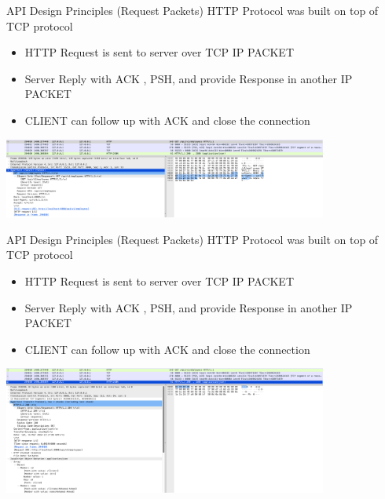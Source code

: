 \documentclass{beamer}
\begin{document}
\begin{frame}{API Design Principles (Request Packets)}
	\scriptsize
	HTTP Protocol was built on top of TCP protocol
	\begin{itemize}
    	\item HTTP Request is sent to server over TCP IP PACKET
    	\item Server Reply with ACK , PSH, and provide Response in another IP PACKET
    	\item CLIENT can follow up with ACK and close the connection
  	\end{itemize}  
   	\begin{center}
   		\includegraphics[width=0.8\textwidth, height=0.5\textheight]{img/api-request.png}
	\end{center}
    
\end{frame}

\begin{frame}{API Design Principles (Request Packets)}
	\scriptsize
	HTTP Protocol was built on top of TCP protocol
	\begin{itemize}
    	\item HTTP Request is sent to server over TCP IP PACKET
    	\item Server Reply with ACK , PSH, and provide Response in another IP PACKET
    	\item CLIENT can follow up with ACK and close the connection
  	\end{itemize}  
  	
   	\begin{center}
   		\includegraphics[width=0.8\textwidth, height=0.5\textheight]{img/api-response.png}
	\end{center}
    
\end{frame}
\end{document}
